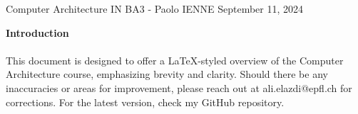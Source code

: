 
\begin{titlepage}
    \centering
    \vspace*{1cm}
    \Huge
    Computer Architecture
    \vspace{10px}
    \newline
    \Large IN BA3 - Paolo IENNE
    \vfill
    \large
    September 11, 2024
\end{titlepage}

\begin{center}
    \vspace*{1cm}
    \textbf{Introduction}
    \newline
    \paragraph[short]{}{This document is designed to offer a LaTeX-styled overview of the Computer Architecture course, emphasizing brevity and clarity. Should there be any inaccuracies or areas for improvement, please reach out at ali.elazdi@epfl.ch for corrections. For the latest version, check my GitHub repository.}
\end{center}

\tableofcontents

